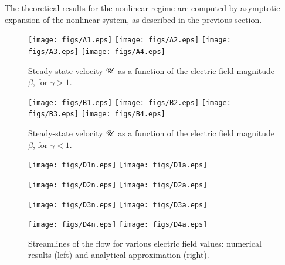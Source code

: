 The theoretical results for the nonlinear regime are computed by asymptotic expansion of the
nonlinear system, as described in the previous section.
\begin{figure}[htbp]
\begin{framed}
    \begin{center}
        \texttt{[image: figs/A1.eps]}
        \texttt{[image: figs/A2.eps]}
        \texttt{[image: figs/A3.eps]}
        \texttt{[image: figs/A4.eps]}
        \caption{Steady-state velocity $\mathscr{U}$ as a function of the electric field magnitude $\beta$, 
        for $\gamma > 1$.}
        \label{fig:NumResA}
    \end{center}
\end{framed}
\end{figure}
\begin{figure}[htbp]
\begin{framed}
    \begin{center}
        \texttt{[image: figs/B1.eps]}
        \texttt{[image: figs/B2.eps]}
        \texttt{[image: figs/B3.eps]}
        \texttt{[image: figs/B4.eps]}
        \caption{Steady-state velocity $\mathscr{U}$ as a function of the electric field magnitude $\beta$,
        for $\gamma < 1$.}
        \label{fig:NumResB}
    \end{center}
\end{framed}
\end{figure}
\begin{figure}[htbp]
\begin{framed}
    \begin{center}
        \texttt{[image: figs/D1n.eps]}
        \texttt{[image: figs/D1a.eps]}
        
        \texttt{[image: figs/D2n.eps]}
        \texttt{[image: figs/D2a.eps]}
        
        \texttt{[image: figs/D3n.eps]}
        \texttt{[image: figs/D3a.eps]}
        
        \texttt{[image: figs/D4n.eps]}
        \texttt{[image: figs/D4a.eps]}
        \caption{Streamlines of the flow for various electric field values: numerical results (left)
        and analytical approximation (right).}
        \label{fig:NumResC}
    \end{center}
\end{framed}
\end{figure}
